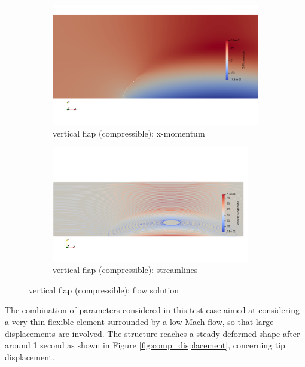 \begin{figure}[htbp!]
	\centering
	\begin{subfigure}{0.9\textwidth}
	\centering
	\includegraphics[width=\textwidth, trim=0 150 0 150, clip]{images/comp_flap/x-mom.png}
	\caption{vertical flap (compressible): x-momentum}
	\end{subfigure}
	\begin{subfigure}{\textwidth}
	\centering
	\includegraphics[width=0.95\textwidth, trim=0 150 0 150, clip]{images/comp_flap/vel-stream.png}
	\caption{vertical flap (compressible): streamlines}
	\end{subfigure}
	\caption{vertical flap (compressible): flow solution}
	\label{fig:comp_sol}
\end{figure}


The combination of parameters considered in this test case aimed at considering a very thin flexible element surrounded by a low-Mach flow, so that large displacements are involved. The structure reaches a steady deformed shape after around 1 second as shown in Figure  \ref{fig:comp_displacement}, concerning tip displacement. 

